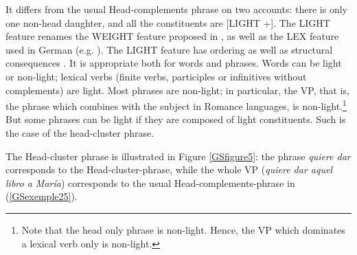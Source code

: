 \documentclass[output=paper]{langsci/langscibook}
\begin{document}
{\begin{exe}
\end{exe}

It differs from the usual Head-complements phrase on two accounts: there is only one non-head daughter, and all the constituents are [LIGHT +]. The LIGHT feature \citep{bonami2012phrase} renames the WEIGHT feature proposed in \cite{abeille2000french}, as well as the LEX feature used in German (e.g. \citealt{hinrichs1989flipped, HN94a-ohne-crossref, kiss1995infinite, Meurers2000, Mueller2002b, hohle2018spuren}). The LIGHT feature has ordering as well as structural consequences \citep{abeille2000french, AG2010}. It is appropriate both for words and phrases. Words can be light or non-light; lexical verbs (finite verbs, participles or infinitives without complements) are light. Most phrases are non-light; in particular, the VP, that is, the phrase which combines with the subject in Romance languages, is non-light.\footnote{Note that the head only phrase is non-light. Hence, the VP which dominates a lexical verb only is non-light.} But some phrases can be light if they are composed of light constituents. Such is the case of the head-cluster phrase. 

The Head-cluster phrase is illustrated in Figure \ref{GSfigure5}: the phrase \textit{quiere dar} corresponds to the Head-cluster-phrase, while the whole VP (\textit{quiere dar aquel libro a Mar\'ia}) corresponds to the usual Head-complements-phrase in (\ref{GSexemple25}).


}
\end{document}
